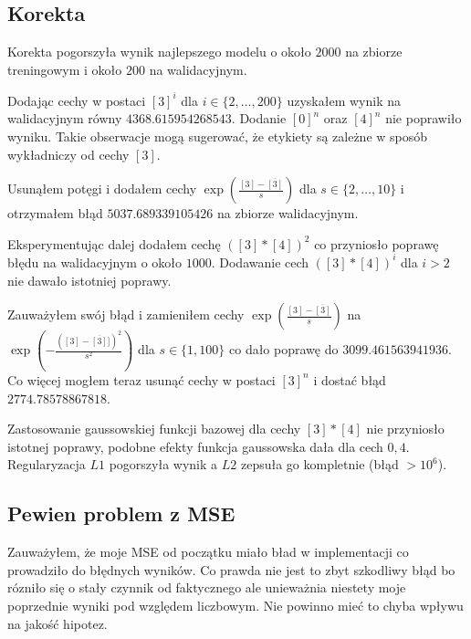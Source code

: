 \documentclass{article}
\begin{document}
  \subsection{Korekta}
  Korekta pogorszyła wynik najlepszego modelu o około $2000$ na zbiorze treningowym i około $200$ na walidacyjnym.

  Dodając cechy w postaci $[3]^i$ dla $i\in\{2,\ldots, 200\}$ uzyskałem wynik na walidacyjnym równy $4368.615954268543$. 
  Dodanie $[0]^n$ oraz $[4]^n$ nie poprawiło wyniku.
  Takie obserwacje mogą sugerować, że etykiety są zależne w sposób wykładniczy od cechy $[3]$.

  Usunąłem potęgi i dodałem cechy $\exp\left(\frac{[3]-\overline{[3]}}{s}\right)$ dla $s\in\{2,\ldots,10\}$ i otrzymałem błąd
  $5037.689339105426$ na zbiorze walidacyjnym.

  Eksperymentując dalej dodałem cechę $([3]*[4])^2$ co przyniosło poprawę błędu na walidacyjnym o około $1000$. 
  Dodawanie cech $([3]*[4])^i$ dla $i > 2$ nie dawało istotniej poprawy.

  Zauważyłem swój błąd i zamieniłem cechy $\exp\left(\frac{[3]-\overline{[3]}}{s}\right)$ na $\exp\left(-\frac{\left([3]-\overline{[3]}]\right)^2}{s^2}\right)$ dla $s\in\{1, 100\}$ 
  co dało poprawę do $3099.461563941936$. Co więcej mogłem teraz usunąć cechy w postaci $[3]^n$ i dostać błąd $2774.78578867818$.

  Zastosowanie gaussowskiej funkcji bazowej dla cechy $[3]*[4]$ nie przyniosło istotnej poprawy, podobne efekty funkcja gaussowska dała dla cech $0, 4$. 
  Regularyzacja $L1$ pogorszyła wynik a $L2$ zepsuła go kompletnie (błąd $>10^6$).

  \subsection{Pewien problem z MSE}
  Zauważyłem, że moje MSE od początku miało bład w implementacji co prowadziło do błędnych wyników. 
  Co prawda nie jest to zbyt szkodliwy błąd bo rózniło się o stały czynnik od faktycznego ale unieważnia niestety moje poprzednie wyniki pod względem liczbowym. 
  Nie powinno mieć to chyba wpływu na jakość hipotez.
\end{document}
